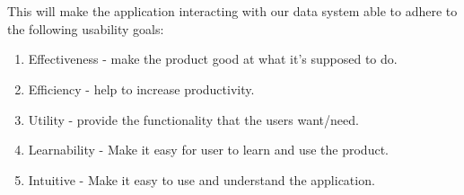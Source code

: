 \newline \\ \\
This will make the application interacting with our data system able to adhere to the following usability goals:
\\
\begin{enumerate}
    \item Effectiveness - make the product good at what it’s supposed to do.
    \item Efficiency - help to increase productivity.
    \item Utility - provide the functionality that the users
    want/need.
    \item Learnability - Make it easy for user to learn and use the product.
    \item Intuitive - Make it easy to use and understand the application.
    
\end{enumerate}
